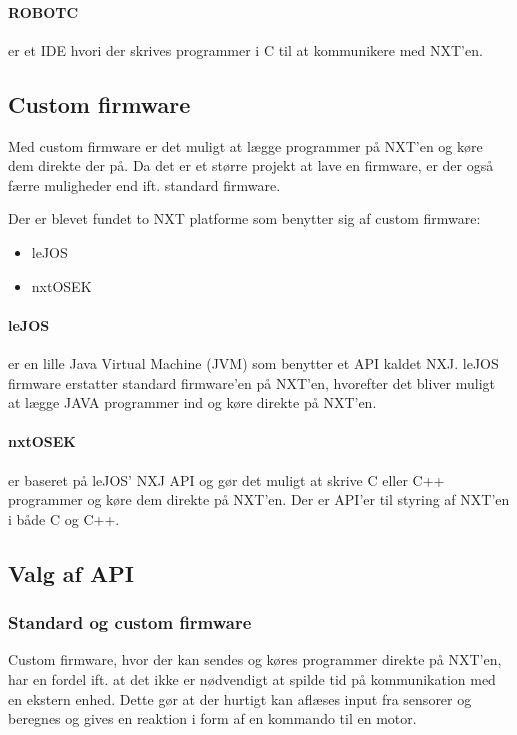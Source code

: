 \paragraph{ROBOTC} er et IDE hvori der skrives programmer i C til at kommunikere med NXT'en.\cite{robotc}

\subsection{Custom firmware}
Med custom firmware er det muligt at lægge programmer på NXT'en og køre dem direkte der på.
Da det er et større projekt at lave en firmware, er der også færre muligheder end ift. standard firmware. 

Der er blevet fundet to NXT platforme som benytter sig af custom firmware:
\begin{itemize}
\item{leJOS}
\item{nxtOSEK}
\end{itemize}

\paragraph{leJOS} er en lille Java Virtual Machine (JVM) som benytter et API kaldet NXJ.
leJOS firmware erstatter standard firmware'en på NXT'en, hvorefter det bliver muligt at lægge JAVA programmer ind og køre direkte på NXT'en.\cite{lejos}

\paragraph{nxtOSEK} er baseret på leJOS' NXJ API og gør det muligt at skrive C eller C++ programmer og køre dem direkte på NXT'en.
Der er API'er til styring af NXT'en i både C og C++.\cite{nxtosek}

\subsection{Valg af API}

\subsubsection{Standard og custom firmware}
Custom firmware, hvor der kan sendes og køres programmer direkte på NXT'en, har en fordel ift. at det ikke er nødvendigt at spilde tid på kommunikation med en ekstern enhed.
Dette gør at der hurtigt kan aflæses input fra sensorer og beregnes og gives en reaktion i form af en kommando til en motor.

